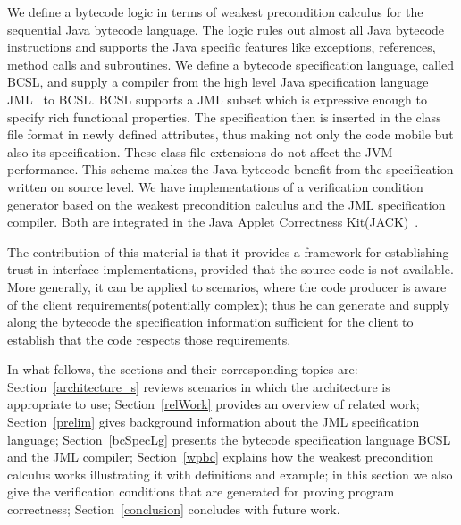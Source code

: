 We define a bytecode logic in terms of weakest precondition calculus for the sequential Java bytecode language. The logic rules out 
almost all Java bytecode instructions and supports the Java specific features like 
exceptions, references, method calls and subroutines.  
 We define a bytecode specification language, called BCSL, and supply a compiler from 
 the high level Java specification language JML~\cite{JMLRefMan} to BCSL. 
 BCSL supports a JML subset which is expressive enough to specify rich functional properties. The specification then is 
 inserted in the class file format in newly defined attributes, thus making not only the code mobile but also its specification. These class
 file extensions do not affect the JVM performance. This scheme makes the Java bytecode benefit from the specification written on source level.
 We have implementations of a verification condition generator based on the weakest precondition calculus and the JML 
specification compiler. Both are integrated in the Java Applet Correctness Kit(JACK)~\cite{BRL-JACK}. 

The contribution of this material is that it provides a framework for establishing trust in interface implementations, 
provided that the source code is not available. More generally, it can be applied to scenarios, where the code producer is 
aware of the client requirements(potentially complex); thus he can generate and supply along the bytecode the 
specification information sufficient for the client to establish that the code respects those requirements.   
  
In what follows, the sections and their corresponding topics are: 
Section~\ref{architecture_s} reviews scenarios in which the architecture is appropriate to use; Section~\ref{relWork} provides an 
overview of related work; Section~\ref{prelim} gives background information about the JML specification language;  Section~\ref{bcSpecLg} presents the bytecode 
specification language BCSL and the JML compiler; Section~\ref{wpbc} explains how the weakest precondition calculus works illustrating it with definitions and example; in this section we also give the verification conditions that are generated for 
proving program correctness;%
Section~\ref{conclusion} concludes with future work.  















